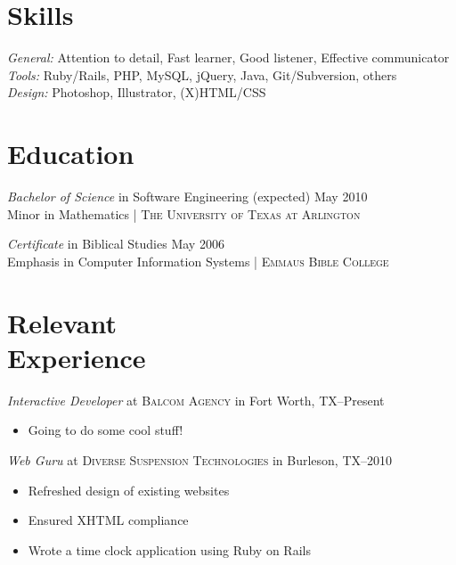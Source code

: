 \documentclass[margin]{res}
\begin{document}
\begin{resume}

\section{\textsf{Skills}}

                \textit{General:} Attention to detail, Fast learner, Good listener, Effective communicator  \\
                \textit{Tools:} Ruby/Rails, PHP, MySQL, jQuery, Java, Git/Subversion, others                \\
                \textit{Design:} Photoshop, Illustrator, (X)HTML/CSS                                       %


\section{\textsf{Education}}

                \textit{Bachelor of Science} in Software Engineering \dotfill (expected) May 2010   \\
								Minor in Mathematics \hfill | \textsc{The University of Texas at Arlington}                                                                
								                
                \textit{Certificate} in Biblical Studies \dotfill May 2006  \\
                Emphasis in Computer Information Systems \hfill | \textsc{Emmaus Bible College}                    



\section{\textsf{Relevant \\ Experience}} 

                \textit{Interactive Developer}
				 at \textsc{Balcom Agency} in Fort Worth, TX--Present
				 \begin{itemize} \itemsep -2pt %
				 	\item Going to do some cool stuff!
				 \end{itemize}

                \textit{Web Guru}
                 at \textsc{Diverse Suspension Technologies} in Burleson, TX--2010
                 \begin{itemize} \itemsep -2pt %
                   \item Refreshed design of existing websites
                   \item Ensured XHTML compliance
                   \item Wrote a time clock application using Ruby on Rails
                \end{itemize}
                

\end{resume}
\end{document}
